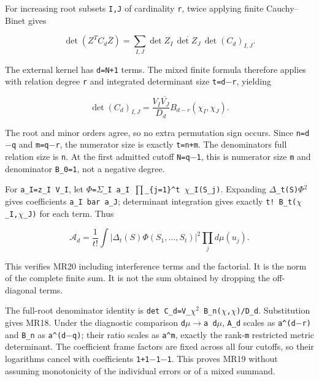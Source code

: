\documentclass[11pt]{article}
\begin{document}
For increasing root subsets \texttt{I,J} of cardinality \texttt{r}, twice applying finite Cauchy--Binet gives

\[
\det(Z^TC_d\overline Z)
=\sum_{I,J}\det Z_I\,\overline{\det Z_J}\,
  \det(C_d)_{I,J}.
\]

The external kernel has \texttt{d=N+1} terms. The mixed finite formula therefore applies with relation degree \texttt{r} and integrated determinant size \texttt{t=d\ensuremath{-}r}, yielding

\[
\det(C_d)_{I,J}
=\frac{V_I\overline{V_J}}{D_d}
 B_{d-r}(\chi_I,\chi_J).
\]

The root and minor orders agree, so no extra permutation sign occurs. Since \texttt{n=d\ensuremath{-}q} and \texttt{m=q\ensuremath{-}r}, the numerator size is exactly \texttt{t=n+m}. The denominator\textquotesingle s full relation size is \texttt{n}. At the first admitted cutoff \texttt{N=q\ensuremath{-}1}, this is numerator size \texttt{m} and denominator \texttt{B\_0=1}, not a negative degree.

For \texttt{a\_I=z\_I\ V\_I}, let \texttt{\ensuremath{\Phi}=\ensuremath{\Sigma}\_I\ a\_I\ \ensuremath{\prod}\_\{j=1\}\^{}t\ \ensuremath{\chi}\_I(S\_j)}. Expanding \texttt{\textbar{}\ensuremath{\Delta}\_t(S)\ensuremath{\Phi}\textbar{}\ensuremath{{}^2}} gives coefficients \texttt{a\_I\ bar\ a\_J}; determinant integration gives exactly \texttt{t!\ B\_t(\ensuremath{\chi}\_I,\ensuremath{\chi}\_J)} for each term. Thus

\[
\mathcal A_d=\frac1{t!}\int|\Delta_t(S)\Phi(S_1,\ldots,S_t)|^2
\prod_jd\mu(u_j).
\]

This verifies MR20 including interference terms and the factorial. It is the norm of the complete finite sum. It is not the sum obtained by dropping the off-diagonal terms.

The full-root denominator identity is \texttt{det\ C\_d=\textbar{}V\_\ensuremath{\chi}\textbar{}\ensuremath{{}^2}\ B\_n(\ensuremath{\chi},\ensuremath{\chi})/D\_d}. Substitution gives MR18. Under the diagnostic comparison \texttt{d\ensuremath{\mu}\ensuremath{\to}a\ d\ensuremath{\mu}}, \texttt{A\_d} scales as \texttt{a\^{}(d\ensuremath{-}r)} and \texttt{B\_n} as \texttt{a\^{}(d\ensuremath{-}q)}; their ratio scales as \texttt{a\^{}m}, exactly the rank-\texttt{m} restricted metric determinant. The coefficient frame factors are fixed across all four cutoffs, so their logarithms cancel with coefficients \texttt{1+1\ensuremath{-}1\ensuremath{-}1}. This proves MR19 without assuming monotonicity of the individual errors or of a mixed summand.
\end{document}
